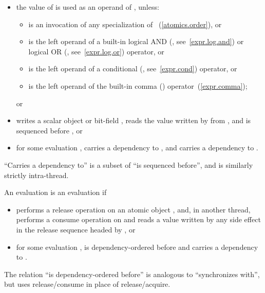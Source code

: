 \begin{itemize}

\item
the value of  is used as an operand of , unless:
\begin{itemize}

\item
{} is an invocation of any specialization of
~(\ref{atomics.order}), or

\item
{} is the left operand of a built-in logical AND (\tcode{\&\&},
see~\ref{expr.log.and}) or logical OR (\tcode{||}, see~\ref{expr.log.or}) 
operator, or

\item
{} is the left operand of a conditional (, see~\ref{expr.cond})
operator, or

\item
{} is the left operand of the built-in comma (\tcode{,})
operator~(\ref{expr.comma}); \end{itemize} or

\item
{} writes a scalar object or bit-field ,  reads the value
written by  from , and  is sequenced before , or

\item
for some evaluation ,  carries a dependency to , and 
 carries a dependency to .

\end{itemize}

\begin{note} ``Carries a dependency to'' is a subset of ``is sequenced before'',
and is similarly strictly intra-thread. \end{note}

\pnum
An evaluation  is  an evaluation
 if
\begin{itemize}

\item
{} performs a release operation on an atomic object , and, in
another thread,  performs a consume operation on  and reads a
value written by any
%
side effect in the release sequence headed by , or

\item
for some evaluation ,  is dependency-ordered before  and
 carries a dependency to .

\end{itemize}
\begin{note} The relation ``is dependency-ordered before'' is analogous to
``synchronizes with'', but uses release/consume in place of release/acquire.
\end{note}

